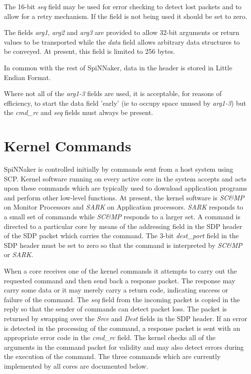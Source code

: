 The 16-bit {\em seq} field may be used for error checking to detect
lost packets and to allow for a retry mechanism. If the field is not
being used it should be set to zero.

The fields {\em arg1}, {\em arg2} and {\em arg3} are provided to allow
32-bit arguments or return values to be transported while the {\em
data} field allows arbitrary data structures to be conveyed. At
present, this field is limited to 256 bytes.

In common with the rest of SpiNNaker, data in the header is stored in
Little Endian Format.

Where not all of the {\em arg1-3} fields are used, it is acceptable, for
reasons of efficiency, to start the data field 'early' (ie to occupy
space unused by {\em arg1-3}) but the {\em cmd\_rc} and {\em seq}
fields must always be present.

\section{Kernel Commands}

SpiNNaker is controlled initially by commands sent from a host system
using SCP. Kernel software running on every active core in the system
accepts and acts upon these commands which are typically used to
download application programs and perform other low-level
functions. At present, the kernel software is {\em SC\&MP} on Monitor
Processors and {\em SARK} on Application processors. {\em SARK}
responds to a small set of commands while {\em SC\&MP} responds to a
larger set. A command is directed to a particular core by means of the
addressing field in the SDP header of the SDP packet which carries the
command. The 3-bit {\em dest\_port} field in the SDP header must be
set to zero so that the command is interpreted by {\em SC\&MP} or {\em
SARK}.

When a core receives one of the kernel commands it attempts to carry
out the requested command and then send back a response packet. The
response may carry some data or it may merely carry a return code,
indicating success or failure of the command. The {\em seq} field from
the incoming packet is copied in the reply so that the sender of
commands can detect packet loss. The packet is returned by swapping
over the {\em Srce} and {\em Dest} fields in the SDP header. If an
error is detected in the processing of the command, a response packet
is sent with an appropriate error code in the {\em cmd\_rc} field. The
kernel checks all of the arguments in the command packet for validity
and may also detect errors during the execution of the command. The three
commands which are currently implemented by all cores are documented
below.

